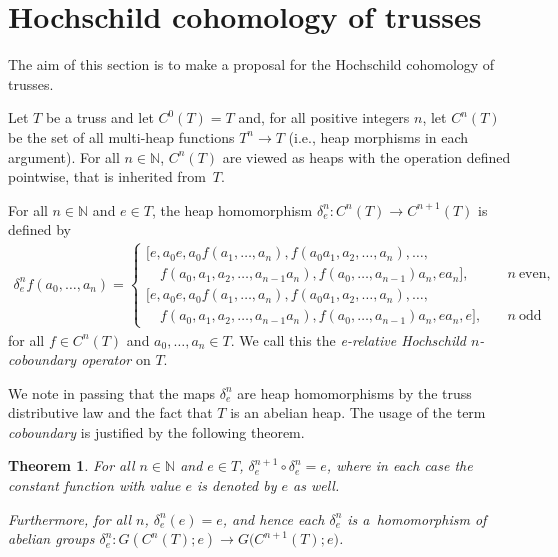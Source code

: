 \documentclass[10pt,a4paper]{amsart}
\numberwithin{equation}{section}
\newtheorem{Theorem}{Theorem}[section]
\newcommand{\N}{\mathbb N}
\begin{document}
\section{Hochschild cohomology of trusses}
The aim of this section is to make a proposal for the Hochschild cohomology of trusses.
\begin{Definition}\label{def.cob}
Let $T$ be a truss and let $C^0(T) = T$ and, for all positive integers $n$, let $C^n(T)$ be the set of all multi-heap functions $T^n\to T$ (i.e., heap morphisms in each argument). For all $n \in \N$, $C^n(T)$ are viewed as heaps with the operation defined pointwise, that is inherited from~$T$.

For all $n \in \N$ and $e\in T$, the heap homomorphism $\delta_e^n\colon C^n(T)\to C^{n+1}(T)$ is defined by
\begin{align*}
 \delta^n_e f(a_0,\dots,a_n) =
 \begin{cases}
 [e, a_0 e, a_0 f(a_1,\dots,a_n), f(a_0a_1, a_2, \dots, a_n), \dots,& \\
 \quad f(a_0,a_1, a_2, \dots, a_{n-1}a_n), f(a_0,\dots,a_{n-1})a_n, ea_n], \quad & n \ \text{even},\\
 [e, a_0 e, a_0 f(a_1,\dots,a_n), f(a_0a_1, a_2, \dots, a_n), \dots, & \\
 \quad f(a_0,a_1, a_2, \dots, a_{n-1}a_n), f(a_0,\dots,a_{n-1})a_n, ea_n, e], \quad &n \ \text{odd} \end{cases}
\end{align*}
for all $f\in C^n(T)$ and $a_0, \dots ,a_n \in T$. We call this the \textit{e-relative Hochschild $n$-coboundary operator} on $T$.
\end{Definition}
We note in passing that the maps $\delta_e^n$ are heap homomorphisms by the truss distributive law and the fact that $T$ is an abelian heap. The usage of the term {\em coboundary} is justified by the following theorem.

\begin{Theorem} \label{deltathme}
For all $n\in \N$ and $e\in T$,
$\delta^{n+1}_e \circ \delta^{n}_e = e$,
where in each case the constant function with value $e$ is denoted by $e$ as well.

Furthermore, for all $n$, $\delta_e^n(e) = e$, and hence each $\delta^n_e$ is a~homomorphism of abelian groups $\delta_e^n\colon G(C^n(T);e) \to G\big(C^{n+1}(T);e\big)$.
\end{Theorem}
\end{document}
